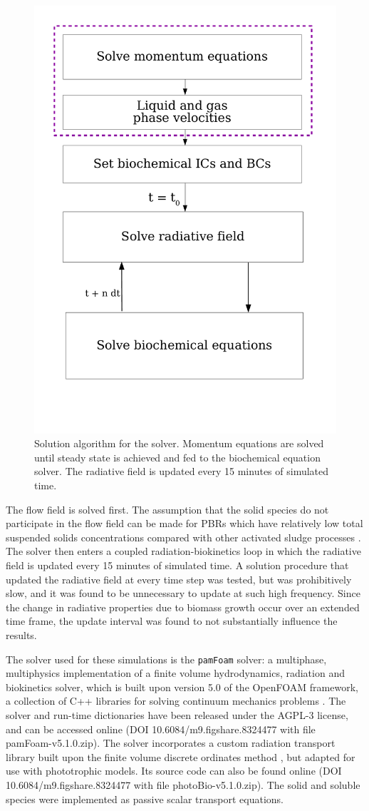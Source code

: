 \begin{figure}[tp]
\centering
\includegraphics[width=0.6\linewidth]{Images/Chap3/algo_devt.pdf}
\caption{Solution algorithm for the solver. Momentum equations are solved until steady state is achieved and fed to the biochemical equation solver. The radiative field is updated every 15 minutes of simulated time.}
\label{fig:solnHierarchy}
\end{figure}

The flow field is solved first. The assumption that the solid species do not participate in the flow field can be made for PBRs which have relatively low total suspended solids concentrations compared with other activated sludge processes \cite{bitog2011}. The solver then enters a coupled radiation-biokinetics loop in which the radiative field is updated every 15 minutes of simulated time. A solution procedure that updated the radiative field at every time step was tested, but was prohibitively slow, and it was found to be unnecessary to update at such high frequency. Since the change in radiative properties due to biomass growth occur over an extended time frame, the update interval was found to not substantially influence the results.
\skippingparagraph

The solver used for these simulations is the \texttt{pamFoam} solver: a multiphase, multiphysics implementation of a finite volume hydrodynamics, radiation and biokinetics solver, which is built upon version 5.0 of the OpenFOAM framework, a collection of C++ libraries for solving continuum mechanics problems \cite{theopenfoamfoundation2017}. The solver and run-time dictionaries have been released under the AGPL-3 license, and can be accessed online (DOI 10.6084/m9.figshare.8324477 with file pamFoam-v5.1.0.zip). The solver incorporates a custom radiation transport library built upon the finite volume discrete ordinates method \cite{raithby1990}, but adapted for use with phototrophic models. Its source code can also be found online (DOI 10.6084/m9.figshare.8324477 with file photoBio-v5.1.0.zip). The solid and soluble species were implemented as passive scalar transport equations.


